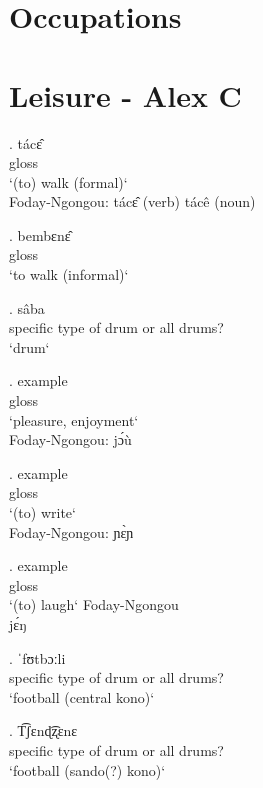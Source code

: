 \documentclass{assets/fieldnotes}
\begin{document}
\section{Occupations} 


\section{Leisure - Alex C} 




\exg.  tácɛ̂\\
gloss \\
`(to) walk (formal)` \\
Foday-Ngongou: tácɛ̂ (verb) tácê (noun)

\exg. bembɛnɛ̂\\
gloss\\ 
`to walk (informal)`

\exg. sâba\\
specific type of drum or all drums? \\
`drum`

\exg. example\\
gloss\\
`pleasure, enjoyment` \\
Foday-Ngongou: jɔ́ù

\exg. example\\
gloss\\
`(to) write` \\
Foday-Ngongou: ɲɛ̀ɲ

\exg. example\\
gloss\\
`(to) laugh`
Foday-Ngongou \\ jɛ́ŋ

\exg. ˈfʊtbɔːli\\
specific type of drum or all drums? \\
`football (central kono)`

\exg. T͡ʃɛnɖ͡ʐɛnɛ\\
specific type of drum or all drums? \\
`football (sando(?) kono)`
\end{document}

